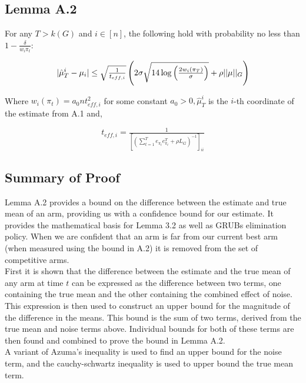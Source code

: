 \documentclass{article}[12pt]
\begin{document}
\subsection{Lemma A.2}

For any $T > k(G)$ and $i \in [n]$, the following hold with probability no less than $1- \tfrac{\delta}{w_i \pi_t}$:

\begin{equation}
 |\hat{\mu}^{i}_{T} - \mu_{i}| \leq \sqrt{\tfrac{1}{t_{eff,i}}}\left( 2\sigma \sqrt{14 \log \left( \tfrac{2 w_i (\boldmath{\pi_T})}{\sigma} \right)} + \rho ||\boldmath{\mu}||_G \right)
\end{equation}


Where $w_i(\pi_t) = a_0 n t_{eff,i}^2$ for some constant $a_0 > 0, \hat{\mu}^i_T$ is the $i$-th coordinate of the estimate from A.1 and,


\begin{equation}
t_{eff,i} = \tfrac{1}{\left[ \left( \sum_{t=1}^T e_{\pi_t} e_{\pi_t}^T + \rho L_G \right)^{-1} \right]_{ii}}
\end{equation}

\subsection{Summary of Proof}

Lemma A.2 provides a bound on the difference between the estimate and true mean of an arm, providing us with a confidence bound for our estimate.
It provides the mathematical basis for Lemma 3.2 as well as GRUBs elimination policy.
When we are confident that an arm is far from our current best arm (when measured using the bound in A.2) it is removed from the set of competitive arms.	\\

First it is shown that the difference between the estimate and the true mean of any arm at time $t$ can be expressed as the difference between two terms,
one containing the true mean and the other containing the combined effect of noise. \\

This expression is then used to construct an upper bound for the magnitude of the difference in the means.
This bound is the sum of two terms, derived from the true mean and noise terms above.
Individual bounds for both of these terms are then found and combined to prove the bound in Lemma A.2. \\

A variant of Azuma’s inequality is used to find an upper bound for the noise term, and the cauchy-schwartz inequality is used to upper bound the true mean term.
\end{document}

